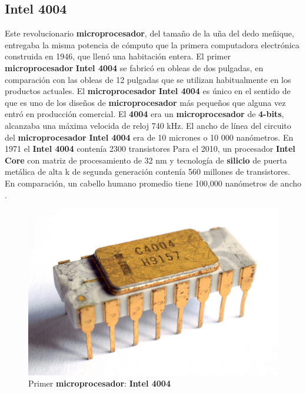 \subsection{Intel 4004}
Este revolucionario \textbf{microprocesador}, del tamaño de la uña del dedo meñique, entregaba la misma potencia de cómputo que la primera
computadora electrónica construida en 1946, que llenó una habitación entera. El primer \textbf{microprocesador} \textbf{Intel 4004} se
fabricó en obleas de dos pulgadas, en comparación con las obleas de 12 pulgadas que se utilizan habitualmente en los productos actuales.
El \textbf {microprocesador} \textbf{Intel 4004} es único en el sentido de que es uno de los diseños de \textbf{microprocesador} más
pequeños que alguna vez entró en producción comercial. El \textbf{4004}  era un \textbf{microprocesador} de \textbf{4-bits}, alcanzaba una máxima
velocida de reloj 740 kHz. El ancho de línea del circuito del \textbf{microprocesador} \textbf{Intel 4004} era de 10 micrones o 10 000
nanómetros. En 1971 el \textbf{Intel 4004} contenía 2300 transistores Para el 2010, un procesador \textbf{Intel Core} con matriz de procesamiento
de 32 nm y tecnología de \textbf{silicio} de puerta metálica de alta k de segunda generación contenía  560 millones de transistores. En comparación,
un cabello humano promedio tiene 100,000 nanómetros de ancho .      

\begin{figure}[htb]
	\centering
	\includegraphics[scale = 0.15]{Graphics/Intel_C4004.jpg}
	\caption{Primer \textbf{microprocesador}: \textbf{Intel 4004}}
	\label{fig:12}
\end{figure}



